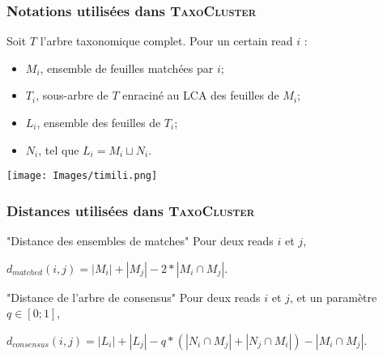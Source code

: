 \documentclass{beamer}
\begin{document}
\begin{frame}
\frametitle{Notations utilisées dans \textsc{\bf TaxoCluster}}

Soit $T$ l'arbre taxonomique complet. Pour un certain read $i$ :
\begin{itemize}
\item $M_{i}$, ensemble de feuilles matchées par $i$;
\item $T_{i}$, sous-arbre de $T$ enraciné au LCA des feuilles de $M_{i}$;
\item $L_{i}$, ensemble des feuilles de $T_{i}$;
\item $N_{i}$, tel que $L_{i} = M_{i} \sqcup N_{i}$.
\end{itemize}

\begin{center}
\texttt{[image: Images/timili.png]}
\end{center}

\end{frame}

\begin{frame}
\frametitle{Distances utilisées dans \textsc{\bf TaxoCluster}}

\begin{block}{"Distance des ensembles de matches"}
Pour deux reads $i$ et $j$,\\
\begin{center} $d_{matched}(i,j) = |M_{i}| + |M_{j}| - 2*|M_{i} \cap M_{j}|$. \end{center}
\end{block}


\begin{block}{"Distance de l'arbre de consensus"}
Pour deux reads $i$ et $j$, et un paramètre $q \in [0;1]$,
\begin{center}$d_{consensus}(i,j) = |L_{i}| + |L_{j}| - q*(|N_{i}\cap M_{j}| + |N_{j} \cap M_{i}|) - |M_{i} \cap M_{j}|$.\end{center}
\end{block}


\end{frame}
\end{document}
